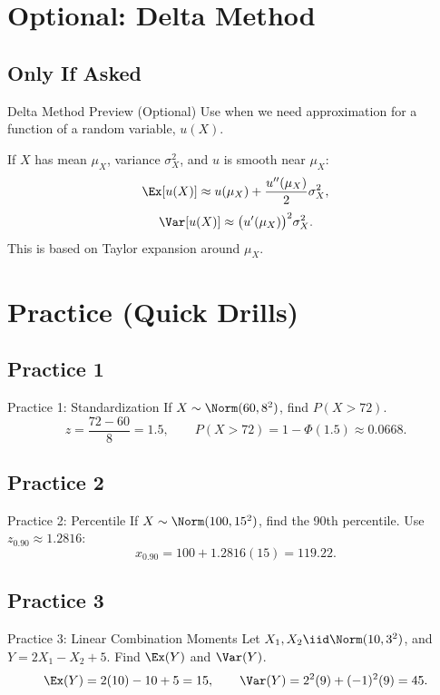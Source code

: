 \documentclass[aspectratio=169]{beamer}
\begin{document}
\section{Optional: Delta Method}

\subsection{Only If Asked}
\begin{frame}{Delta Method Preview (Optional)}
  Use when we need approximation for a function of a random variable, \(u(X)\).

  If \(X\) has mean \(\mu_X\), variance \(\sigma_X^2\), and \(u\) is smooth near \(\mu_X\):
  \[
    \Ex[u(X)]\approx u(\mu_X)+\frac{u''(\mu_X)}{2}\sigma_X^2,
  \]
  \[
    \Var[u(X)]\approx \bigl(u'(\mu_X)\bigr)^2\sigma_X^2.
  \]
  This is based on Taylor expansion around \(\mu_X\).
\end{frame}

\section{Practice (Quick Drills)}

\subsection{Practice 1}
\begin{frame}{Practice 1: Standardization}
  If \(X\sim\Norm(60,8^2)\), find \(P(X>72)\).
  \pause
  \[
    z=\frac{72-60}{8}=1.5,
    \qquad
    P(X>72)=1-\Phi(1.5)\approx0.0668.
  \]
\end{frame}

\subsection{Practice 2}
\begin{frame}{Practice 2: Percentile}
  If \(X\sim\Norm(100,15^2)\), find the 90th percentile.
  \pause
  Use \(z_{0.90}\approx1.2816\):
  \[
    x_{0.90}=100+1.2816(15)=119.22.
  \]
\end{frame}

\subsection{Practice 3}
\begin{frame}{Practice 3: Linear Combination Moments}
  Let \(X_1,X_2\iid\Norm(10,3^2)\), and \(Y=2X_1-X_2+5\).
  Find \(\Ex(Y)\) and \(\Var(Y)\).
  \pause
  \[
    \Ex(Y)=2(10)-10+5=15,
    \qquad
    \Var(Y)=2^2(9)+(-1)^2(9)=45.
  \]
\end{frame}
\end{document}
